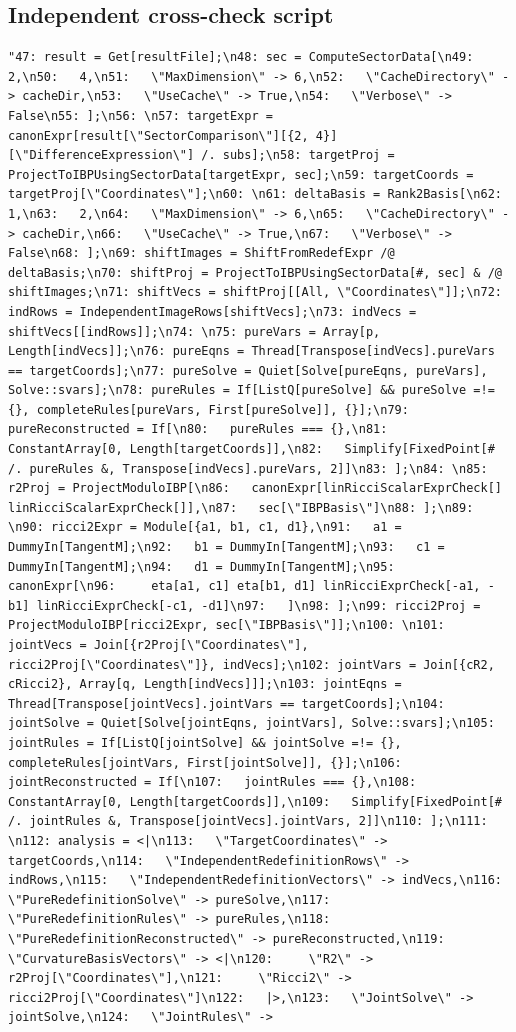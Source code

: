 \documentclass[11pt]{article}
\begin{document}
\subsection{Independent cross-check script}
\begin{verbatim}
"47: result = Get[resultFile];\n48: sec = ComputeSectorData[\n49:   2,\n50:   4,\n51:   \"MaxDimension\" -> 6,\n52:   \"CacheDirectory\" -> cacheDir,\n53:   \"UseCache\" -> True,\n54:   \"Verbose\" -> False\n55: ];\n56: \n57: targetExpr = canonExpr[result[\"SectorComparison\"][{2, 4}][\"DifferenceExpression\"] /. subs];\n58: targetProj = ProjectToIBPUsingSectorData[targetExpr, sec];\n59: targetCoords = targetProj[\"Coordinates\"];\n60: \n61: deltaBasis = Rank2Basis[\n62:   1,\n63:   2,\n64:   \"MaxDimension\" -> 6,\n65:   \"CacheDirectory\" -> cacheDir,\n66:   \"UseCache\" -> True,\n67:   \"Verbose\" -> False\n68: ];\n69: shiftImages = ShiftFromRedefExpr /@ deltaBasis;\n70: shiftProj = ProjectToIBPUsingSectorData[#, sec] & /@ shiftImages;\n71: shiftVecs = shiftProj[[All, \"Coordinates\"]];\n72: indRows = IndependentImageRows[shiftVecs];\n73: indVecs = shiftVecs[[indRows]];\n74: \n75: pureVars = Array[p, Length[indVecs]];\n76: pureEqns = Thread[Transpose[indVecs].pureVars == targetCoords];\n77: pureSolve = Quiet[Solve[pureEqns, pureVars], Solve::svars];\n78: pureRules = If[ListQ[pureSolve] && pureSolve =!= {}, completeRules[pureVars, First[pureSolve]], {}];\n79: pureReconstructed = If[\n80:   pureRules === {},\n81:   ConstantArray[0, Length[targetCoords]],\n82:   Simplify[FixedPoint[# /. pureRules &, Transpose[indVecs].pureVars, 2]]\n83: ];\n84: \n85: r2Proj = ProjectModuloIBP[\n86:   canonExpr[linRicciScalarExprCheck[] linRicciScalarExprCheck[]],\n87:   sec[\"IBPBasis\"]\n88: ];\n89: \n90: ricci2Expr = Module[{a1, b1, c1, d1},\n91:   a1 = DummyIn[TangentM];\n92:   b1 = DummyIn[TangentM];\n93:   c1 = DummyIn[TangentM];\n94:   d1 = DummyIn[TangentM];\n95:   canonExpr[\n96:     eta[a1, c1] eta[b1, d1] linRicciExprCheck[-a1, -b1] linRicciExprCheck[-c1, -d1]\n97:   ]\n98: ];\n99: ricci2Proj = ProjectModuloIBP[ricci2Expr, sec[\"IBPBasis\"]];\n100: \n101: jointVecs = Join[{r2Proj[\"Coordinates\"], ricci2Proj[\"Coordinates\"]}, indVecs];\n102: jointVars = Join[{cR2, cRicci2}, Array[q, Length[indVecs]]];\n103: jointEqns = Thread[Transpose[jointVecs].jointVars == targetCoords];\n104: jointSolve = Quiet[Solve[jointEqns, jointVars], Solve::svars];\n105: jointRules = If[ListQ[jointSolve] && jointSolve =!= {}, completeRules[jointVars, First[jointSolve]], {}];\n106: jointReconstructed = If[\n107:   jointRules === {},\n108:   ConstantArray[0, Length[targetCoords]],\n109:   Simplify[FixedPoint[# /. jointRules &, Transpose[jointVecs].jointVars, 2]]\n110: ];\n111: \n112: analysis = <|\n113:   \"TargetCoordinates\" -> targetCoords,\n114:   \"IndependentRedefinitionRows\" -> indRows,\n115:   \"IndependentRedefinitionVectors\" -> indVecs,\n116:   \"PureRedefinitionSolve\" -> pureSolve,\n117:   \"PureRedefinitionRules\" -> pureRules,\n118:   \"PureRedefinitionReconstructed\" -> pureReconstructed,\n119:   \"CurvatureBasisVectors\" -> <|\n120:     \"R2\" -> r2Proj[\"Coordinates\"],\n121:     \"Ricci2\" -> ricci2Proj[\"Coordinates\"]\n122:   |>,\n123:   \"JointSolve\" -> jointSolve,\n124:   \"JointRules\" -> 
\end{verbatim}
\end{document}
